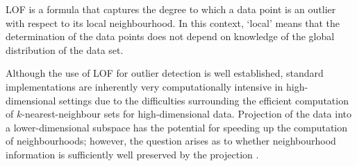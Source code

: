 \gls{LOF} is a formula that captures the degree to which a data point is an
outlier with respect to its local neighbourhood. In this context, `local' means
that the determination of the data points does not depend on knowledge of the
global distribution of the data set.

Although the use of \gls{LOF} for outlier detection is well established,
standard implementations are inherently very computationally intensive in
high-dimensional settings due to the difficulties surrounding the efficient
computation of $k$-nearest-neighbour sets for high-dimensional data. Projection
of the data into a lower-dimensional subspace has the potential for speeding up
the computation of neighbourhoods; however, the question arises as to whether
neighbourhood information is sufficiently well preserved by the projection
\cite{Khoa:2012}.
